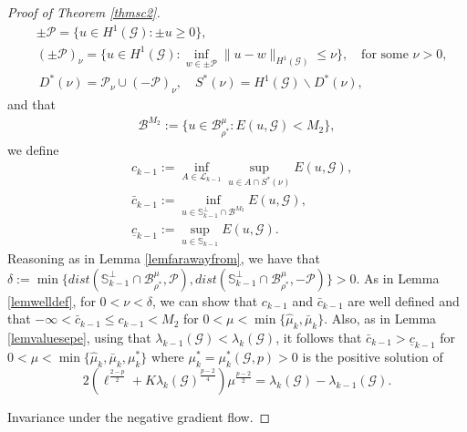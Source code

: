 \documentclass[10pt,a4paper]{article}
\theoremstyle{definition} \theoremstyle{remark}
\numberwithin{equation}{section}
\newcommand{\G}{\mathcal{G}}
\newcommand{\B}{\mathcal{B}}
\newcommand{\K}{\mathcal{K}}
\newcommand{\p}{\mathcal{P}}
\newcommand{\s}{\mathbb{S}}
\newcommand{\cl}{\mathcal{L}}
\newcommand{\la}{\lambda}
\begin{document}
\begin{proof}[Proof of Theorem \ref{thmsc2}]
\begin{align*}
			& \pm \p = \bigl\{u \in H^1(\G): \pm u \geq 0\bigl\},\\
			& (\pm \p)_\nu = \bigl\{u \in H^1(\G): \inf_{w \in \pm \p}\|u -w\|_{H^1(\G)} \le \nu\bigr\}, \quad \text{for some } \nu > 0,  \\
			& \ D^*(\nu) = \p_\nu \cup (-\p)_\nu, \quad S^*(\nu) = H^1(\G) \backslash D^*(\nu),
		\end{align*}	
    and that
    \begin{align*}
    	\B^{M_2} := \bigl\{u \in \B_{\rho^*}^\mu: E(u,\G) < M_2\bigr\},
    \end{align*}
	we define
	\begin{align*}
		& c_{k-1} := \inf_{A \in \cl_{k-1}}\sup_{u \in A\cap S^*(\nu)}E(u,\G), \\
		& \bar{c}_{k-1} := \inf_{u\in\s_{k-1}^\perp \cap \B^{M_2}}E(u,\G), \\
		& \underline{c}_{k-1} := \sup_{u \in \s_{k-1}}E(u,\G).
	\end{align*}
	Reasoning as in Lemma \ref{lemfarawayfrom}, we have that $\delta := \min\{dist(\mathbb{S}_{k-1}^\perp \cap \B_{\rho^*}^\mu, \p), dist(\mathbb{S}_{k-1}^\perp \cap \B_{\rho^*}^\mu, -\p)\} > 0$. As in Lemma \ref{lemwelldef}, for $0 < \nu < \delta$, we can show that $c_{k-1}$ and $\bar{c}_{k-1}$ are well defined and that $ - \infty <\bar{c}_{k-1} \leq c_{k-1} < M_2$ for $0 < \mu < \min\{\hat{\mu}_k,\bar{\mu}_k\}$. Also, as in Lemma \ref{lemvaluesepe}, using that $\lambda_{k-1}(\G) < \lambda_k(\G)$, it follows that  $\bar{c}_{k-1} > \underline{c}_{k-1}$ for $0 < \mu < \min\{\hat{\mu}_k,\bar{\mu}_k, \mu^*_k\}$ where $\mu^*_k = \mu^*_k(\G,p) > 0$ is the positive solution of
	$$
	2\left( \ell^{\frac{2-p}2} + K\la_k(\G)^{\frac{p-2}4}\right) \mu^{\frac {p-2}2} = \la_k(\G) - \la_{k-1}(\G).
	$$

	
	\vskip0.1in
	 Invariance under the negative gradient flow.
	

\end{proof}
\end{document}
